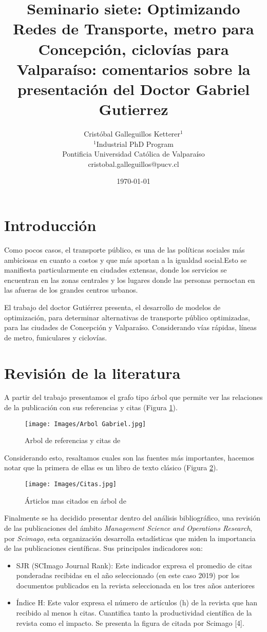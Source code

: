 \documentclass{article}
\title{Seminario siete: Optimizando Redes de Transporte, metro para Concepción, ciclovías para Valparaíso: comentarios sobre la presentación del Doctor Gabriel Gutierrez}
\author{Cristóbal Galleguillos Ketterer$^{1}$\\
\small{$^{1}$Industrial PhD Program}\\
\small{Pontificia Universidad Católica de Valparaíso}\\
\small{cristobal.galleguillos@pucv.cl}
}
\date{\small{\today}}
\begin{document}
\maketitle

\section{Introducción}

Como pocos casos, el transporte público, es una de las políticas sociales más ambiciosas en cuanto a costos y que más aportan a la igualdad social.Esto se manifiesta particularmente en ciudades extensas, donde los servicios se encuentran en las zonas centrales y los lugares donde las personas pernoctan en las afueras de los grandes centros urbanos.

El trabajo del doctor Gutiérrez presenta, el desarrollo de modelos de optimización, para determinar alternativas de transporte público optimizadas, para las ciudades de Concepción y Valparaíso. Considerando vías rápidas, líneas de metro, funiculares y ciclovías.

\section{Revisión de la literatura}

A partir del trabajo presentamos el grafo tipo árbol que permite ver las relaciones de la publicación con sus referencias y citas (Figura \ref{arb}).

\begin{figure}[H]
\texttt{[image: Images/Arbol Gabriel.jpg]}
\centering
\caption{Arbol de referencias y citas de \cite{article1}}
\label{arb}
\end{figure}

Considerando esto, resaltamos cuales son las fuentes más importantes, hacemos notar que la primera de ellas es un libro de texto clásico (Figura \ref{mas}).

\begin{figure}[H]
\texttt{[image: Images/Citas.jpg]}
\centering
\caption{Árticlos mas citados en árbol de \cite{article1}}
\label{mas}
\end{figure}

Finalmente se ha decidido presentar dentro del análisis bibliográfico, una revisión de las publicaciones del ámbito 
\textsl{Management Science and Operations Research}, por \textsl{ Scimago}, esta organización desarrolla estadísticas que miden la importancia de las publicaciones científicas.
Sus principales indicadores son:
\begin{itemize}
\item SJR (SCImago Journal Rank): Este indicador expresa el promedio de citas ponderadas recibidas en el año seleccionado (en este caso 2019) por los documentos publicados en la revista seleccionada en los tres años anteriores
\item Índice H: Este valor expresa el número de artículos (h) de la revista que han recibido al menos h citas. Cuantifica tanto la productividad científica de la revista como el impacto. Se presenta la figura de citada por Scimago [4].
\end{itemize}
\end{document}
